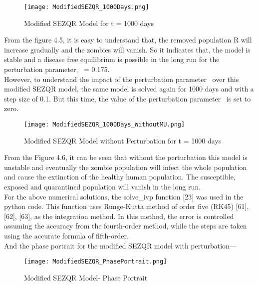 \begin{figure}[H]
\centering
\texttt{[image: ModifiedSEZQR\_1000Days.png]}
\caption{Modified SEZQR Model for t = 1000 days}
\label{fig:Modified SEZQR Model 1000 days}
\end{figure}

From the figure 4.5, it is easy to understand that, the removed population R will increase gradually and the zombies will vanish. So it indicates that, the model is stable and a disease free equilibrium is possible in the long run for the perturbation parameter, \textmu \ = 0.175. \\

However, to understand the impact of the perturbation parameter \textmu \ over this modified SEZQR model, the same model is solved again for 1000 days and with a step size of 0.1. But this time, the value of the perturbation parameter \textmu \ is set to zero. 

\begin{figure}[H]
\centering
\texttt{[image: ModifiedSEZQR\_1000Days\_WithoutMU.png]}
\caption{Modified SEZQR Model without Perturbation for t = 1000 days}
\label{fig:Modified SEZQR Model Without Mu}
\end{figure}

From the Figure 4.6, it can be seen that without the perturbation this model is unstable and eventually the zombie population will infect the whole population and cause the extinction of the healthy human population. The susceptible, exposed and quarantined population will vanish in the long run. \\

For the above numerical solutions, the solve\_ivp function [23] was used in the python code. This function uses Runge-Kutta method of order five (RK45) [61], [62], [63], as the integration method. In this method, the error is controlled assuming the accuracy from the fourth-order method, while the steps are taken using the accurate formula of fifth-order. \\

And the phase portrait for the modified SEZQR model with perturbation---\\

\begin{figure}[H]
\centering
\texttt{[image: ModifiedSEZQR\_PhasePortrait.png]}
\caption{Modified SEZQR Model- Phase Portrait}
\label{fig:Modified SEZQR Phase Portrait}
\end{figure}

